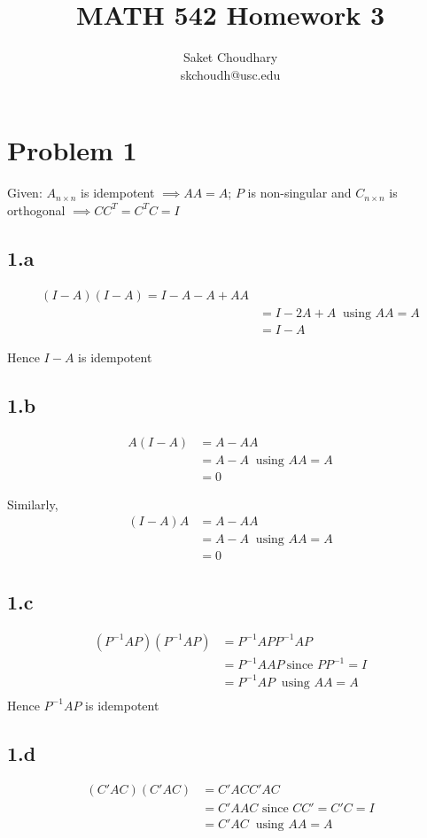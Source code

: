 \documentclass[a4paper]{article}
\title{MATH 542 Homework 3}
\author{Saket Choudhary\\skchoudh@usc.edu}
\begin{document}
\maketitle 
\section*{Problem 1}

Given: $A_{n\times n}$ is idempotent $\implies AA=A$; $P$ is non-singular and $C_{n\times n}$ is orthogonal $\implies CC^T=C^TC=I$

\subsection*{1.a}
\begin{align*}
(I-A)(I-A) = I-A-A+AA\\
&= I-2A+A\ \text{ using } AA=A\\
&=I-A
\end{align*}

Hence $I-A$ is idempotent

\subsection*{1.b}
\begin{align*}
A(I-A) &= A-AA\\
&= A-A\ \text{ using } AA=A\\
&=0
\end{align*}

Similarly,
\begin{align*}
(I-A)A &= A-AA\\
&= A-A\ \text{ using } AA=A\\
&=0
\end{align*}

\subsection*{1.c}
\begin{align*}
(P^{-1}AP)(P^{-1}AP)  &=P^{-1}APP^{-1}AP\\ 
&= P^{-1}AAP \ \text{since }PP^{-1}=I\\
&= P^{-1}AP\ \text{ using } AA=A\\
\end{align*}
Hence $P^{-1}AP$ is idempotent

\subsection*{1.d}
\begin{align*}
(C'AC)(C'AC) &=C'ACC'AC\\
&= C'AAC \text{ since } CC'=C'C=I\\
&= C'AC \ \text{ using } AA=A\\
\end{align*}
\end{document}
